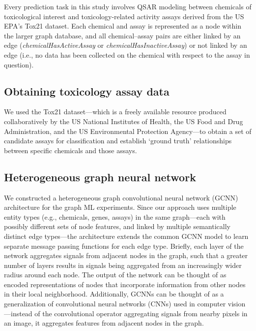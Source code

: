 \documentclass{ws-procs11x85}
\begin{document}
Every prediction task in this study involves QSAR modeling between chemicals of toxicological interest and toxicology-related activity assays derived from the US EPA's Tox21 dataset.
Each chemical and assay is represented as a node within the larger graph database, and all chemical--assay pairs are either linked by an edge (\textit{chemicalHasActiveAssay} or \textit{chemicalHasInactiveAssay}) or not linked by an edge (i.e., no data has been collected on the chemical with respect to the assay in question). 

\subsection{Obtaining toxicology assay data}
We used the Tox21 dataset---which is a freely available resource produced collaboratively by the US National Institutes of Health, the US Food and Drug Administration, and the US Environmental Protection Agency---to obtain a set of candidate assays for classification and establish `ground truth' relationships between specific chemicals and those assays.

\subsection{Heterogeneous graph neural network}
We constructed a heterogeneous graph convolutional neural network (GCNN) architecture for the graph ML experiments.
Since our approach uses multiple entity types (e.g., chemicals, genes, assays) in the same graph---each with possibly different sets of node features, and linked by multiple semantically distinct edge types---the architecture extends the common GCNN model to learn separate message passing functions for each edge type.
Briefly, each layer of the network aggregates signals from adjacent nodes in the graph, such that a greater number of layers results in signals being aggregated from an increasingly wider radius around each node.
The output of the network can be thought of as encoded representations of nodes that incorporate information from other nodes in their local neighborhood.
Additionally, GCNNs can be thought of as a generalization of convolutional neural networks (CNNs) used in computer vision---instead of the convolutional operator aggregating signals from nearby pixels in an image, it aggregates features from adjacent nodes in the graph.
\end{document}
